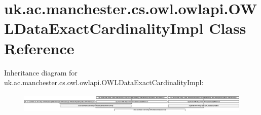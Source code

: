 \hypertarget{classuk_1_1ac_1_1manchester_1_1cs_1_1owl_1_1owlapi_1_1_o_w_l_data_exact_cardinality_impl}{\section{uk.\-ac.\-manchester.\-cs.\-owl.\-owlapi.\-O\-W\-L\-Data\-Exact\-Cardinality\-Impl Class Reference}
\label{classuk_1_1ac_1_1manchester_1_1cs_1_1owl_1_1owlapi_1_1_o_w_l_data_exact_cardinality_impl}
}
Inheritance diagram for uk.\-ac.\-manchester.\-cs.\-owl.\-owlapi.\-O\-W\-L\-Data\-Exact\-Cardinality\-Impl\-:\begin{figure}[H]
\begin{center}
\leavevmode
\includegraphics[height=0.965934cm]{classuk_1_1ac_1_1manchester_1_1cs_1_1owl_1_1owlapi_1_1_o_w_l_data_exact_cardinality_impl}
\end{center}
\end{figure}
